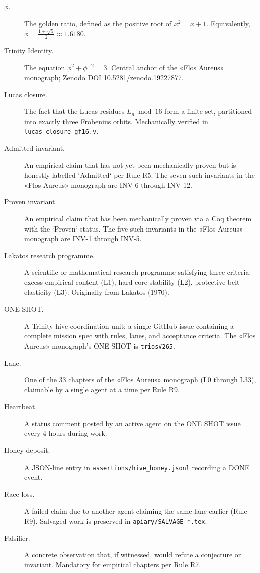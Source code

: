 \begin{description}
    \item[$\phi$.] The golden ratio, defined as the positive root of $x^{2} = x + 1$. Equivalently, $\phi = \frac{1 + \sqrt{5}}{2} \approx 1.6180$.
    \item[Trinity Identity.] The equation $\phi^{2} + \phi^{-2} = 3$. Central anchor of the «Flos Aureus» monograph; Zenodo DOI 10.5281/zenodo.19227877.
    \item[Lucas closure.] The fact that the Lucas residues $L_{n} \bmod 16$ form a finite set, partitioned into exactly three Frobenius orbits. Mechanically verified in \texttt{lucas\_closure\_gf16.v}.
    \item[Admitted invariant.] An empirical claim that has not yet been mechanically proven but is honestly labelled `Admitted` per Rule R5. The seven such invariants in the «Flos Aureus» monograph are INV-6 through INV-12.
    \item[Proven invariant.] An empirical claim that has been mechanically proven via a Coq theorem with the `Proven` status. The five such invariants in the «Flos Aureus» monograph are INV-1 through INV-5.
    \item[Lakatos research programme.] A scientific or mathematical research programme satisfying three criteria: excess empirical content (L1), hard-core stability (L2), protective belt elasticity (L3). Originally from Lakatos (1970).
    \item[ONE SHOT.] A Trinity-hive coordination unit: a single GitHub issue containing a complete mission spec with rules, lanes, and acceptance criteria. The «Flos Aureus» monograph's ONE SHOT is \texttt{trios\#265}.
    \item[Lane.] One of the 33 chapters of the «Flos Aureus» monograph (L0 through L33), claimable by a single agent at a time per Rule R9.
    \item[Heartbeat.] A status comment posted by an active agent on the ONE SHOT issue every 4 hours during work.
    \item[Honey deposit.] A JSON-line entry in \texttt{assertions/hive\_honey.jsonl} recording a DONE event.
    \item[Race-loss.] A failed claim due to another agent claiming the same lane earlier (Rule R9). Salvaged work is preserved in \texttt{apiary/SALVAGE\_*.tex}.
    \item[Falsifier.] A concrete observation that, if witnessed, would refute a conjecture or invariant. Mandatory for empirical chapters per Rule R7.

\end{description}
